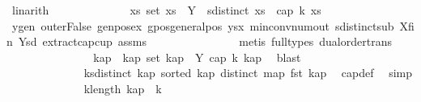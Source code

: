 \begin{isabellebody}
\ linarith\isanewline
\isanewline
\ \ \ \ \ \ \ \ \ \ \ \ \isamarkupfalse%
\ {}{\isacharcolon}{\kern0pt}{\isachardoublequoteopen}{\isasymexists}xs{\isachardot}{\kern0pt}\ set\ xs\ {\isasymsubseteq}\ Y\ {\isasymand}\ sdistinct\ xs\ {\isasymand}\ {\isacharparenleft}{\kern0pt}cap\ {\isacharparenleft}{\kern0pt}k{\isacharminus}{\kern0pt}{}{\isacharparenright}{\kern0pt}\ xs{\isacharparenright}{\kern0pt}{\isachardoublequoteclose}\isanewline
\ \ \ \ \ \ \ \ \ \ \ \ \ \ \isamarkupfalse%
\ ygen\ outerFalse\ genpos{\isacharunderscore}{\kern0pt}ex\ gpos{\isacharunderscore}{\kern0pt}generalpos\ ysx\ min{\isacharunderscore}{\kern0pt}conv{\isacharunderscore}{\kern0pt}num{\isacharunderscore}{\kern0pt}out\ sdistinct{\isacharunderscore}{\kern0pt}sub\ X{\isacharunderscore}{\kern0pt}fin\ Y{\isacharunderscore}{\kern0pt}sd\ extract{\isacharunderscore}{\kern0pt}cap{\isacharunderscore}{\kern0pt}cup\ assms{\isacharparenleft}{\kern0pt}{}{\isacharcomma}{\kern0pt}{}{\isacharparenright}{\kern0pt}\isanewline
\ \ \ \ \ \ \ \ \ \ \ \ \ \ \isamarkupfalse%
\ {\isacharparenleft}{\kern0pt}metis\ {\isacharparenleft}{\kern0pt}full{\isacharunderscore}{\kern0pt}types{\isacharparenright}{\kern0pt}\ dual{\isacharunderscore}{\kern0pt}order{\isachardot}{\kern0pt}trans{\isacharparenright}{\kern0pt}\isanewline
\isanewline
\isanewline
\isanewline
\ \ \ \ \ \ \ \ \ \ \ \ \isamarkupfalse%
\ \isamarkupfalse%
\ kap\ \ kap{\isacharcolon}{\kern0pt}\ {\isachardoublequoteopen}set\ kap\ {\isasymsubseteq}\ Y{\isachardoublequoteclose}\ {\isachardoublequoteopen}{\isacharparenleft}{\kern0pt}cap\ {\isacharparenleft}{\kern0pt}k{\isacharminus}{\kern0pt}{}{\isacharparenright}{\kern0pt}\ kap{\isacharparenright}{\kern0pt}{\isachardoublequoteclose}\ \isamarkupfalse%
\ blast\isanewline
\ \ \ \ \ \ \ \ \ \ \ \ \ \ \ \ \isanewline
\ \ \ \ \ \ \ \ \ \ \ \ \isamarkupfalse%
\ k{}{\isacharcolon}{\kern0pt}{\isachardoublequoteopen}sdistinct\ kap{\isachardoublequoteclose}\ {\isachardoublequoteopen}sorted\ kap{\isachardoublequoteclose}\ {\isachardoublequoteopen}distinct\ {\isacharparenleft}{\kern0pt}map\ fst\ kap{\isacharparenright}{\kern0pt}{\isachardoublequoteclose}\ \isamarkupfalse%
\ cap{\isacharunderscore}{\kern0pt}def\ \isamarkupfalse%
\ simp{\isacharplus}{\kern0pt}\isanewline
\ \ \ \ \ \ \ \ \ \ \ \ \isamarkupfalse%
\ k{}{\isacharcolon}{\kern0pt}{\isachardoublequoteopen}length\ kap\ {\isacharequal}{\kern0pt}\ k{\isacharminus}{\kern0pt}{}{\isachardoublequoteclose}\ \isamarkupfalse%

\end{isabellebody}

